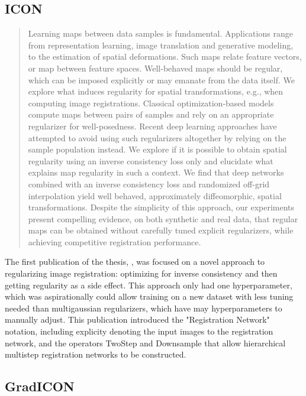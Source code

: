 \documentclass{article}
\begin{document}
\subsection{ICON}
\begin{abstract}

	Learning maps between data samples is fundamental. Applications range from
	representation learning, image translation and generative modeling, to the
	estimation of spatial deformations. Such maps relate feature vectors, or map
	between feature spaces. Well-behaved maps should be regular, which can be
	imposed explicitly or may emanate from the data itself. We explore what induces
	regularity for spatial transformations, e.g., when computing image
	registrations. Classical optimization-based models compute maps between pairs
	of samples and rely on an appropriate regularizer for well-posedness. Recent
	deep learning approaches have attempted to avoid using such regularizers
	altogether by relying on the sample population instead. We explore if it is
	possible to obtain spatial regularity using an inverse consistency loss only
	and elucidate what explains map regularity in such a context. We find that deep
	networks combined with an inverse consistency loss and randomized off-grid
	interpolation yield well behaved, approximately diffeomorphic, spatial
	transformations. Despite the simplicity of this approach, our experiments
	present compelling evidence, on both synthetic and real data, that regular maps
	can be obtained without carefully tuned explicit regularizers, while achieving
	competitive registration performance.%
\end{abstract}
The first publication of the thesis, \cite{greer2021icon}, was focused on a novel approach to regularizing image registration: optimizing for inverse consistency and then getting regularity as a side effect. This approach only had one hyperparameter, which was aspirationally could allow training on a new dataset with less tuning needed than multigaussian regularizers, which have may hyperparameters to manually adjust. This publication introduced the "Registration Network" notation, including explicity denoting the input images to the registration network, and the operators TwoStep and Downsample that allow hierarchical multistep registration networks to be constructed.
\subsection{GradICON}
\end{document}
